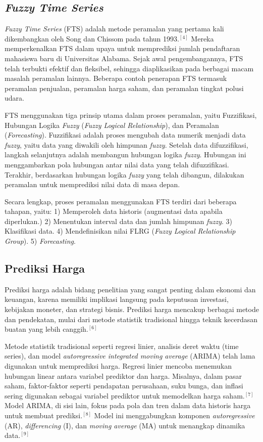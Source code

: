 \documentclass[conference]{IEEEtran}
\begin{document}
\subsection{\textit{Fuzzy Time Series}}
\textit{Fuzzy Time Series} (FTS) adalah metode peramalan yang pertama kali dikembangkan oleh Song dan Chissom pada tahun 1993.$^{[4]}$ Mereka memperkenalkan FTS dalam upaya untuk memprediksi jumlah pendaftaran mahasiswa baru di Universitas Alabama. Sejak awal pengembangannya, FTS telah terbukti efektif dan fleksibel, sehingga diaplikasikan pada berbagai macam masalah peramalan lainnya. Beberapa contoh penerapan FTS termasuk peramalan penjualan, peramalan harga saham, dan peramalan tingkat polusi udara.

FTS menggunakan tiga prinsip utama dalam proses peramalan, yaitu Fuzzifikasi, Hubungan Logika \textit{Fuzzy} (\textit{Fuzzy Logical Relationship}), dan Peramalan (\textit{Forecasting}). Fuzzifikasi adalah proses mengubah data numerik menjadi data \textit{fuzzy}, yaitu data yang diwakili oleh himpunan \textit{fuzzy}. Setelah data difuzzifikasi, langkah selanjutnya adalah membangun hubungan logika \textit{fuzzy}. Hubungan ini menggambarkan pola hubungan antar nilai data yang telah difuzzifikasi. Terakhir, berdasarkan hubungan logika \textit{fuzzy} yang telah dibangun, dilakukan peramalan untuk memprediksi nilai data di masa depan.

Secara lengkap, proses peramalan menggunakan FTS terdiri dari beberapa tahapan, yaitu:
    1) Memperoleh data historis (augmentasi data apabila diperlukan.)
    2) Menentukan interval data dan jumlah himpunan \textit{fuzzy}.
    3) Klasifikasi data.
    4) Mendefinisikan nilai FLRG (\textit{Fuzzy Logical Relationship Group}).
    5) \textit{Forecasting}.
    

\subsection{Prediksi Harga}
Prediksi harga adalah bidang penelitian yang sangat penting dalam ekonomi dan keuangan, karena memiliki implikasi langsung pada keputusan investasi, kebijakan moneter, dan strategi bisnis. Prediksi harga mencakup berbagai metode dan pendekatan, mulai dari metode statistik tradisional hingga teknik kecerdasan buatan yang lebih canggih.$^{[6]}$

Metode statistik tradisional seperti regresi linier, analisis deret waktu (time series), dan model \textit{autoregressive integrated moving average} (ARIMA) telah lama digunakan untuk memprediksi harga. Regresi linier mencoba menemukan hubungan linear antara variabel prediktor dan harga. Misalnya, dalam pasar saham, faktor-faktor seperti pendapatan perusahaan, suku bunga, dan inflasi sering digunakan sebagai variabel prediktor untuk memodelkan harga saham.$^{[7]}$ Model ARIMA, di sisi lain, fokus pada pola dan tren dalam data historis harga untuk membuat prediksi.$^{[8]}$ Model ini menggabungkan komponen \textit{autoregressive} (AR), \textit{differencing} (I), dan \textit{moving average} (MA) untuk menangkap dinamika data.$^{[9]}$
\end{document}
